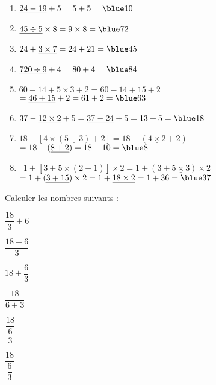 \begin{colonne*exercice}
\begin{corrige}
   \ \\ [-5mm]
   \begin{enumerate}
      \item $\underline{24-19}+5 =5+5 =\blue 10$ \smallskip
      \item $\underline{45\div5}\times8 =9\times8 =\blue 72$ \smallskip
      \item $24+\underline{3\times7} =24+21 =\blue 45$ \smallskip
      \item $\underline{720\div9}+4 =80+4 =\blue 84$ \smallskip
      \item $60-14+\underline{5\times3}+2 =\underline{60-14}+15+2$ \\
         \quad $=\underline{46+15}+2 =61+2 =\blue 63$ \smallskip
      \item $37-\underline{12\times2}+5 =\underline{37-24}+5 =13+5 =\blue 18$ \smallskip
      \item $18-[4\times(\underline{5-3})+2] =18-(\underline{4\times2}+2)$ \\
         \quad $=18-(\underline{8+2}) =18-10 =\blue 8$ \smallskip
      \item \, $1+[3+5\times(\underline{2+1})]\times2 =1+(3+\underline{5\times3})\times2$ \\
         \quad $=1+(\underline{3+15})\times2 =1+\underline{18\times2} =1+36 =\blue 37$
   \end{enumerate}
\end{corrige}

\bigskip


\begin{exercice} %
   Calculer les nombres suivants :
   \begin{colenumerate}{3}
      \item $\dfrac{18}{3}+6$ \bigskip
      \item $\dfrac{18+6}{3}$
      \item $18+\dfrac{6}{3}$
      \item $\dfrac{18}{6+3}$
      \item $\dfrac{\dfrac{18}{6}}{3}$
      \item $\dfrac{18}{\dfrac{6}{3}}$
   \end{colenumerate}
\end{exercice}


\end{colonne*exercice}
